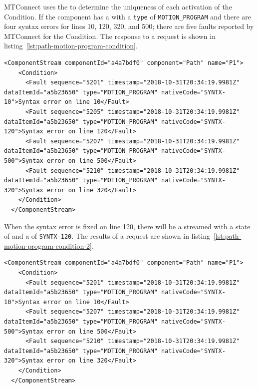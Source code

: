 MTConnect uses the  to determine the uniqueness of each activation of the Condition. If the  component has a  with a \texttt{type} of \texttt{MOTION_PROGRAM} and there are four syntax errors for lines 10, 120, 320, and 500; there are five faults reported by MTConnect for the Condition. The response to a  request is shown in listing~\ref{lst:path-motion-program-condition}.

\begin{lstlisting}[firstnumber=last,escapechar=|,%
    caption={Path Motion Program Syntax Errors},label={lst:path-motion-program-condition}]
  <ComponentStream componentId="a4a7bdf0" component="Path" name="P1">
    <Condition>
      <Fault sequence="5201" timestamp="2018-10-31T20:34:19.9981Z" dataItemId="a5b23650" type="MOTION_PROGRAM" nativeCode="SYNTX-10">Syntax error on line 10</Fault>
      <Fault sequence="5205" timestamp="2018-10-31T20:34:19.9981Z" dataItemId="a5b23650" type="MOTION_PROGRAM" nativeCode="SYNTX-120">Syntax error on line 120</Fault>
      <Fault sequence="5207" timestamp="2018-10-31T20:34:19.9981Z" dataItemId="a5b23650" type="MOTION_PROGRAM" nativeCode="SYNTX-500">Syntax error on line 500</Fault>
      <Fault sequence="5210" timestamp="2018-10-31T20:34:19.9981Z" dataItemId="a5b23650" type="MOTION_PROGRAM" nativeCode="SYNTX-320">Syntax error on line 320</Fault>
    </Condition>
  </ComponentStream>
\end{lstlisting}

When the syntax error is fixed on line 120, there will be a  streamed with a state of  and a  of \texttt{SYNTX-120}. The results of a  request are shown in listing~\ref{lst:path-motion-program-condition-2}.

\begin{lstlisting}[firstnumber=last,escapechar=|,%
    caption={Path Motion Program Clearing Syntax Error on Line 120},label={lst:path-motion-program-condition-2}]
  <ComponentStream componentId="a4a7bdf0" component="Path" name="P1">
    <Condition>
      <Fault sequence="5201" timestamp="2018-10-31T20:34:19.9981Z" dataItemId="a5b23650" type="MOTION_PROGRAM" nativeCode="SYNTX-10">Syntax error on line 10</Fault>
      <Fault sequence="5207" timestamp="2018-10-31T20:34:19.9981Z" dataItemId="a5b23650" type="MOTION_PROGRAM" nativeCode="SYNTX-500">Syntax error on line 500</Fault>
      <Fault sequence="5210" timestamp="2018-10-31T20:34:19.9981Z" dataItemId="a5b23650" type="MOTION_PROGRAM" nativeCode="SYNTX-320">Syntax error on line 320</Fault>
    </Condition>
  </ComponentStream>
\end{lstlisting}

